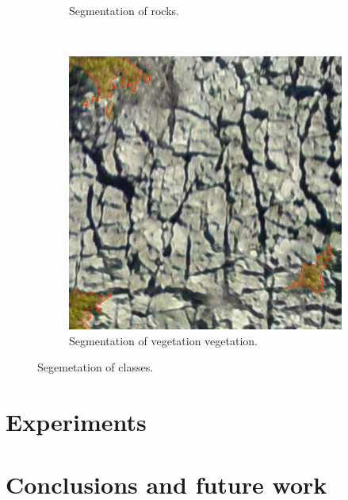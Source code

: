 \documentclass[10pt,twocolumn,letterpaper]{article}
\begin{document}
\begin{figure}[t]
\begin{subfigure}[b]{0.37\textwidth}
      \caption{Segmentation of rocks.}
    \label{fig:prob-rocks}
  \end{subfigure}
  ~
  \begin{subfigure}[b]{0.37\textwidth}
      \includegraphics[width=\textwidth]{figures/vegetacao.png}
      \caption{Segmentation of vegetation vegetation.}
  \label{fig:prob-vegetation}
  \end{subfigure}

  \caption{Segemetation of classes.}
  \label{fig:prob_map}
\end{figure}

\section{Experiments}

\section{Conclusions and future work}

{\small


}
\end{document}
